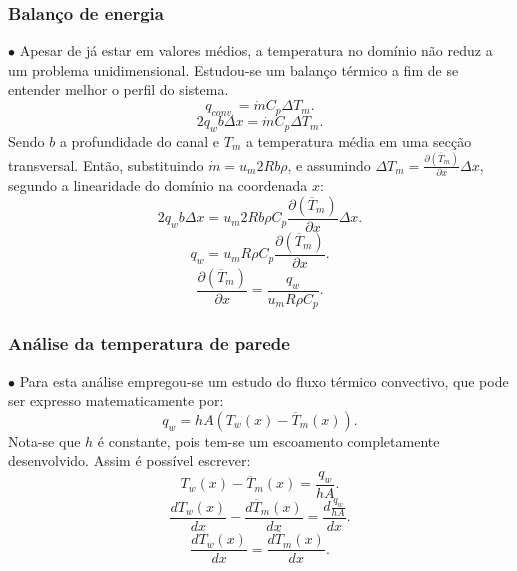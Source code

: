 \documentclass[xcolor=dvipsnames,10pt,aspectratio=169]{beamer}
\begin{document}
		
	
	
	
		\begin{frame}
		\frametitle{Balanço de energia}
		$\bullet$ Apesar de já estar em valores médios, a temperatura no domínio não reduz a um problema unidimensional. Estudou-se um balanço térmico a fim de se entender melhor o perfil do sistema.
		\begin{equation}\label{c_h_e}
		q_{conv.} = \dot{m} C_p \Delta T_m.
		\end{equation}
		\begin{equation}
		2q_w b \Delta x = \dot{m} C_p \Delta T_m.
		\end{equation}
		Sendo $b$ a profundidade do canal e $T_m$ a temperatura média em uma secção transversal. Então, substituindo $ \dot{m} = u_m 2R b \rho $, e assumindo $ \Delta T_m = \frac{\partial{\left(\overline{T}_m\right)}}{\partial{x}} \Delta x $, segundo a linearidade do domínio na coordenada $ x $:
		\begin{equation}
		2q_w b \Delta x = u_m 2R b \rho  C_p \frac{\partial{\left(\overline{T}_m\right)}}{\partial{x}} \Delta x.
		\end{equation}     
		\begin{equation}
		q_w = u_m R \rho  C_p \frac{\partial{\left(\overline{T}_m\right)}}{\partial{x}} .
		\end{equation} 
		\begin{equation}\label{c_h_ee}
		\frac{\partial{\left(\overline{T}_m\right)}}{\partial{x}} = \frac{q_w}{u_m  R \rho  C_p } .
		\end{equation} 
		\end{frame}
	
	
	
	
		\begin{frame}
		\frametitle{Análise da temperatura de parede}
		$\bullet$ Para esta análise empregou-se um estudo do fluxo térmico convectivo, que pode ser expresso matematicamente por:
		\begin{equation}
		q_w = h A \left( T_w(x) - \overline{T}_m(x)\right).
		\end{equation}
		Nota-se que $h$ é constante, pois tem-se um escoamento completamente desenvolvido. Assim é possível escrever:
		\begin{equation}
		 T_w(x) - \overline{T}_m(x) = \frac{q_w}{hA}.
		\end{equation}
		\begin{equation}
		\frac{d T_w(x)}{d x} - \frac{d \overline{T}_m(x)}{d x} = \frac{d \frac{q_w}{hA}}{dx}.
		\end{equation}
		\begin{equation}
		\frac{d T_w(x)}{d x} = \frac{d \overline{T}_m(x)}{d x}.
		\end{equation}	
		\end{frame}
	
\end{document}
